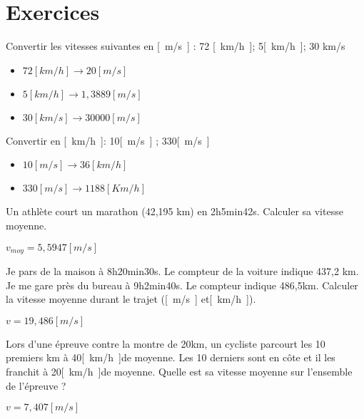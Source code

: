 \section{Exercices}
\begin{exercise}
    Convertir les vitesses suivantes en \unit{[m/s]} : 72 \unit{[km/h]}; 5\unit{[km/h]}; 30 km/s
\end{exercise}
\begin{solution}
    \begin{itemize}
        \item \(72[km/h] \rightarrow 20[m/s]\)
        \item \(5[km/h] \rightarrow 1,3889[m/s]\)
        \item \(30[km/s] \rightarrow 30000[m/s]\)
    \end{itemize}

\end{solution}

\begin{exercise}
    Convertir en \unit{[km/h]}: 10\unit{[m/s]} ; 330\unit{[m/s]}
\end{exercise}
\begin{solution}
    \begin{itemize}
        \item \(10[m/s] \rightarrow 36[km/h]\)
        \item \(330[m/s] \rightarrow 1188[Km/h]\)
    \end{itemize}
\end{solution}


\begin{exercise}
    Un athlète court un marathon (42,195 km) en 2h5min42s. Calculer sa vitesse moyenne.
\end{exercise}
\begin{solution}
    \(v_{moy}=5,5947[m/s]\)
\end{solution}


\begin{exercise}
    Je pars de la maison à 8h20min30s. Le compteur de la voiture indique 437,2 km.
    Je me gare près du bureau à 9h2min40s. Le compteur indique 486,5km.
    Calculer la vitesse moyenne durant le trajet (\unit{[m/s]} et\unit{[km/h]}).
\end{exercise}
\begin{solution}
    \(v=19,486\unit{[m/s]}\)
\end{solution}


\begin{exercise}
    Lors d'une épreuve contre la montre de 20km, un cycliste parcourt les 10 premiers km à 40\unit{[km/h]}de moyenne. Les 10 derniers sont en côte et il les franchit à 20\unit{[km/h]}de moyenne. Quelle est sa vitesse moyenne sur l'ensemble de l'épreuve ?
\end{exercise}
\begin{solution}
    \(v=7,407\unit{[m/s]}\)
\end{solution}


